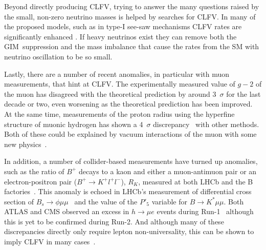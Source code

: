 Beyond directly producing \ac{CLFV}, trying to answer the many questions raised by the small, non-zero neutrino masses is helped by searches for \ac{CLFV}.
In many of the proposed models, such as in type-I see-saw mechanisms \ac{CLFV} rates are significantly enhanced .
If heavy neutrinos exist they can remove both the GIM~suppression and the mass imbalance that cause the rates from the \ac{SM} with neutrino oscillation to be so small.

Lastly, there are a number of recent anomalies, in particular with muon measurements, that hint at \ac{CLFV}.
The experimentally measured value of $g-2$ of the muon has disagreed with the theoretical prediction by around 3~$\sigma$ for the last decade or two, even worsening as the theoretical prediction has been improved.
At the same time, measurements of the proton radius using the hyperfine structure of muonic hydrogen has shown a 4~$\sigma$ discrepancy~\cite{} with other methods.
Both of these could be explained by vacuum interactions of the muon with some new physics~\cite{}.

In addition, a number of collider-based measurements have turned up anomalies, such as the ratio of $B^+$ decays to a kaon and either a muon-antimuon pair or an electron-positron pair ($B^+\rightarrow K^+l^+l^-$), $R_K$, measured at both LHCb and the B factories~\cite{}.
This anomaly is echoed in LHCb's measurement of differential cross section of $B_s\rightarrow\phi\mu\mu$~\cite{} and the value of the $P'_5$ variable for $B\rightarrow K^*\mu\mu$.
Both ATLAS and CMS observed an excess in $h\rightarrow\mu e$ events during Run-1~\cite{} although this is yet to be confirmed during Run-2.
And although many of these discrepancies directly only require lepton non-universality, this can be shown to imply \ac{CLFV} in many cases~\cite{}.

